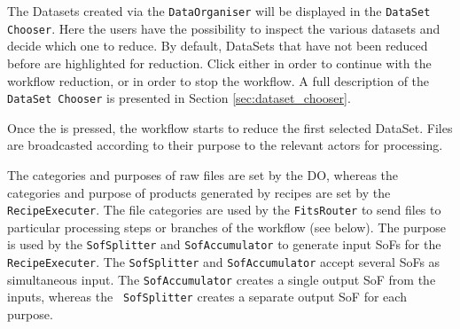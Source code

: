 The Datasets created via the {\tt DataOrganiser} will be displayed in
the {\tt DataSet Chooser}. Here the users have the possibility to inspect
the various datasets and decide which one to reduce. By default,
DataSets that have not been reduced before are highlighted for
reduction. Click either  in order to continue with
the workflow reduction, or  in order to stop the
workflow. A full description of the {\tt DataSet Chooser} is presented
in Section \ref{sec:dataset_chooser}.


Once the  is pressed, the workflow starts to reduce
the first selected DataSet. Files are broadcasted according to their
purpose to the relevant actors for processing.


The categories and purposes of raw files are set by the DO, whereas
the categories and purpose of products generated by recipes are set by
the {\tt RecipeExecuter}.  The file
categories are used by the {\tt FitsRouter} to send files to particular
processing steps or branches of the workflow (see below). The purpose
is used by the {\tt SofSplitter} and {\tt SofAccumulator} to generate
input SoFs for the {\tt RecipeExecuter}.  
The {\tt SofSplitter} and {\tt SofAccumulator}
accept several SoFs as simultaneous input. The {\tt SofAccumulator}
creates a single output SoF from the inputs, whereas the {\tt
  SofSplitter} creates a separate output SoF for each purpose.


